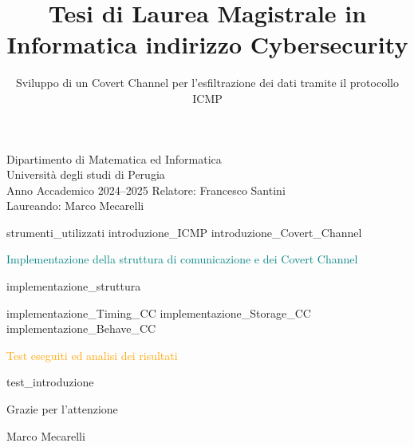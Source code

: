 \documentclass[11pt,xcolor={dvipsnames},usepdftitle=false]{beamer}
\begin{document}
\title{Tesi di Laurea Magistrale in Informatica indirizzo Cybersecurity}
\subtitle{
\Large
Sviluppo di un Covert Channel per l'esfiltrazione 
dei dati tramite il protocollo ICMP
}

\information%
%
%
{\small
Dipartimento di Matematica ed Informatica\\
Università degli studi di Perugia\\
Anno Accademico 2024--2025
\vspace{2ex} \newline 
\textrm{Relatore:} Francesco Santini \\
\textrm{Laureando:} Marco Mecarelli
}  
%

\frame{\titlepage}

{strumenti_utilizzati}  
{introduzione_ICMP} 
{introduzione_Covert_Channel}  


\begin{frame}
\vfill
\begin{center}
{\huge \textcolor{teal}{Implementazione della struttura di comunicazione e dei Covert Channel}}
\end{center}
\vfill 
\end{frame} 
{implementazione_struttura}  

{implementazione_Timing_CC}  
{implementazione_Storage_CC}   
{implementazione_Behave_CC}  

\begin{frame}
\vfill
\begin{center}
{\huge \textcolor{orange}{Test eseguiti ed analisi dei risultati}}
\end{center}
\vfill 
\end{frame} 
{test_introduzione} 

\begin{frame}
\vfill
\begin{center}
{\Huge Grazie per l'attenzione}
\end{center}
\vfill
\begin{center}
Marco Mecarelli
\end{center}
\end{frame}
\end{document}
